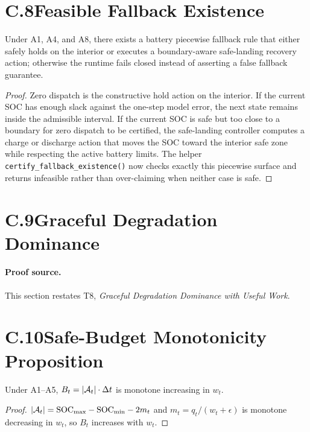 \section{C.8\quad Feasible Fallback Existence}\label{sec:proof-fallback}
\begin{theorem}[restated]
Under A1, A4, and A8, there exists a battery piecewise fallback rule that
either safely holds on the interior or executes a boundary-aware safe-landing
recovery action; otherwise the runtime fails closed instead of asserting a
false fallback guarantee.
\end{theorem}
\begin{proof}
Zero dispatch is the constructive hold action on the interior.  If the current
SOC has enough slack against the one-step model error, the next state remains
inside the admissible interval.  If the current SOC is safe but too close to a
boundary for zero dispatch to be certified, the safe-landing controller
computes a charge or discharge action that moves the SOC toward the interior
safe zone while respecting the active battery limits.  The helper
\texttt{certify\_fallback\_existence()} now checks exactly this piecewise
surface and returns infeasible rather than over-claiming when neither case is
safe.  \qedhere
\end{proof}

\section{C.9\quad Graceful Degradation Dominance}\label{sec:proof-graceful}
\paragraph{Proof source.} This section restates T8,
\emph{Graceful Degradation Dominance with Useful Work}.


\section{C.10\quad Safe-Budget Monotonicity Proposition}\label{sec:proof-budget}
\begin{proposition}[restated]
Under A1--A5, $B_t=|\mathcal{A}_t|\cdot\Delta t$ is monotone increasing in $w_t$.
\end{proposition}
\begin{proof}
$|\mathcal{A}_t|=\mathrm{SOC}_{\max}-\mathrm{SOC}_{\min}-2m_t$ and
$m_t=q_t/(w_t+\epsilon)$ is monotone decreasing in $w_t$, so $B_t$
increases with $w_t$.  \qedhere
\end{proof}


